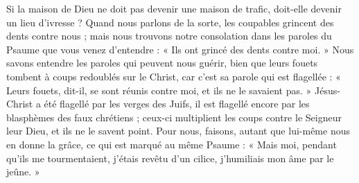 Si la maison de Dieu ne doit pas devenir une maison de trafic, doit-elle devenir un lieu d’ivresse ? Quand nous parlons de la sorte, les coupables grincent des dents contre nous ; mais nous trouvons notre consolation dans les paroles du Psaume que vous venez d’entendre : « Ils ont grincé des dents contre moi. » Nous savons entendre les paroles qui peuvent nous guérir, bien que leurs fouets tombent à coups redoublés sur le Christ, car c’est sa parole qui est flagellée : « Leurs fouets, dit-il, se sont réunis contre moi, et ils ne le savaient pas. » Jésus-Christ a été flagellé par les verges des Juifs, il est flagellé encore par les blasphèmes des faux chrétiens ; ceux-ci multiplient les coups contre le Seigneur leur Dieu, et ils ne le savent point. Pour nous, faisons, autant que lui-même nous en donne la grâce, ce qui est marqué au même Psaume : « Mais moi, pendant qu’ils me tourmentaient, j’étais revêtu d’un cilice, j’humiliais mon âme par le jeûne. »
